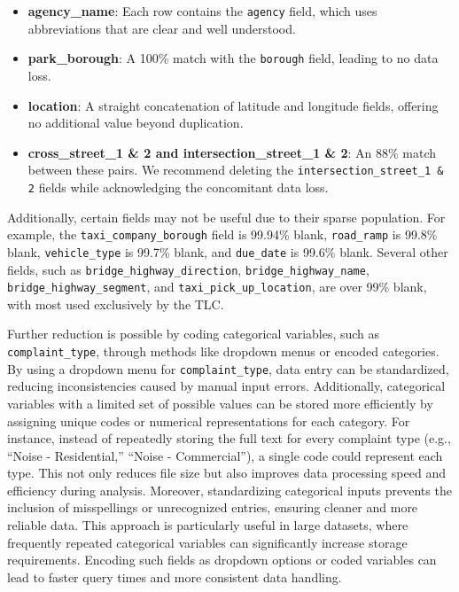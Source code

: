 \documentclass[linenumber]{jdsart}
\begin{document}
\begin{itemize}
    \item \textbf{agency\_name}: Each row contains the \texttt{agency} field, 
    which uses abbreviations that are clear and well understood.
    
    \item \textbf{park\_borough}: A 100\% match with the \texttt{borough} field, 
    leading to no data loss.
    
    \item \textbf{location}: A straight concatenation of latitude and longitude 
    fields, offering no additional value beyond duplication.
     
    \item \textbf{cross\_street\_1 \& 2 and intersection\_street\_1 \& 2}: 
    An 88\% match between these pairs. We recommend deleting the 
    \texttt{intersection\_street\_1 \& 2} fields while acknowledging the
    concomitant data loss.
    
\end{itemize}

Additionally, certain fields may not be useful due to their sparse population. 
For example, the \texttt{taxi\_company\_borough} field is 99.94\% blank, 
\texttt{road\_ramp} is 99.8\% blank, \texttt{vehicle\_type} is 99.7\% blank, 
and \texttt{due\_date} is 99.6\% blank. Several other fields, such as 
\texttt{bridge\_highway\_direction}, \texttt{bridge\_highway\_name}, 
\texttt{bridge\_highway\_segment}, and \texttt{taxi\_pick\_up\_location}, 
are over 99\% blank, with most used exclusively by the TLC.


Further reduction is possible by coding categorical 
variables, such as \texttt{complaint\_type}, through methods like dropdown 
menus or encoded categories. By using a dropdown menu for 
\texttt{complaint\_type}, data entry can be standardized, reducing 
inconsistencies caused by manual input errors. Additionally, categorical 
variables with a limited set of possible values can be stored more 
efficiently by assigning unique codes or numerical representations for 
each category. For instance, instead of repeatedly storing the full text 
for every complaint type (e.g., ``Noise - Residential,'' ``Noise - 
Commercial''), a single code could represent each type. This not only 
reduces file size but also improves data processing speed and efficiency 
during analysis. Moreover, standardizing categorical inputs prevents 
the inclusion of misspellings or unrecognized entries, ensuring cleaner 
and more reliable data. This approach is particularly useful in large 
datasets, where frequently repeated categorical variables can 
significantly increase storage requirements. Encoding such fields 
as dropdown options or coded variables can lead to faster query times 
and more consistent data handling.
\end{document}
